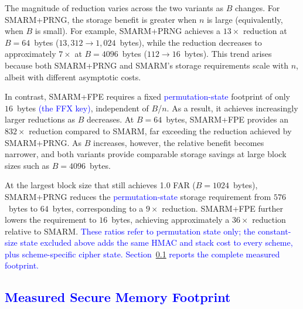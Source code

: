\documentclass[journal]{IEEEtran}
\newcommand\ben[1]{\textcolor{blue}{#1}}
\newcommand{\rtsmarmone}{SMARM+PRNG\xspace}
\newcommand{\rtsmarmtwo}{SMARM+FPE\xspace}
\begin{document}
The magnitude of reduction varies across the two variants as $B$ changes.
For \rtsmarmone, the storage benefit is greater when $n$ is large (equivalently, when $B$ is small).
For example, \rtsmarmone achieves a $13\times$ reduction at $B = 64$~bytes ($13{,}312 \rightarrow 1{,}024$~bytes), while the reduction decreases to approximately $7\times$ at $B = 4096$~bytes ($112 \rightarrow 16$~bytes). This trend arises because both \rtsmarmone and SMARM's storage requirements scale with $n$, albeit with different asymptotic costs.

In contrast, \rtsmarmtwo requires a fixed \ben{permutation-state} footprint of only $16$~bytes \ben{(the FFX key)}, independent of $B$/$n$.
As a result, it achieves increasingly larger reductions as $B$ decreases.
At $B = 64$~bytes, \rtsmarmtwo provides an $832\times$ reduction compared to SMARM, far exceeding the reduction achieved by \rtsmarmone.
As $B$ increases, however, the relative benefit becomes narrower, and both variants provide comparable storage savings at large block sizes such as $B = 4096$~bytes.

At the largest block size that still achieves 1.0 FAR ($B = 1024$~bytes), \rtsmarmone reduces the \ben{permutation-state} storage requirement from $576$~bytes to $64$~bytes, corresponding to a $9\times$ reduction.
\rtsmarmtwo further lowers the requirement to $16$~bytes, achieving approximately a $36\times$ reduction relative to SMARM.
\ben{These ratios refer to permutation state only; the constant-size state excluded above adds the same HMAC and stack cost to every scheme, plus scheme-specific cipher state.
Section~\ref{sec:footprint} reports the complete measured footprint.}

\subsection{\ben{Measured Secure Memory Footprint}}
\label{sec:footprint}
\end{document}
